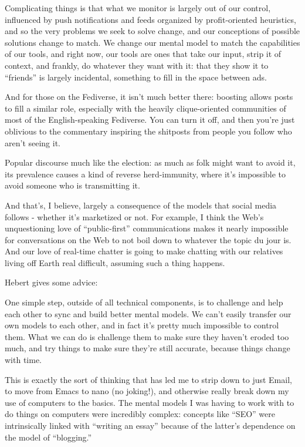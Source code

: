 \documentclass[11pt]{article}
\begin{document}
\begin{itemize}
Complicating things is that what we monitor is largely out of our control, influenced by push notifications and feeds organized by profit-oriented heuristics, and so the very problems we seek to solve change, and our conceptions of possible solutions change to match. We change our mental model to match the capabilities of our tools, and right now, our tools are ones that take our input, strip it of context, and frankly, do whatever they want with it: that they show it to “friends” is largely incidental, something to fill in the space between ads.

And for those on the Fediverse, it isn’t much better there: boosting allows posts to fill a similar role, especially with the heavily clique-oriented communities of most of the English-speaking Fediverse. You can turn it off, and then you’re just oblivious to the commentary inspiring the shitposts from people you follow who aren’t seeing it.

Popular discourse much like the election: as much as folk might want to avoid it, its prevalence causes a kind of reverse herd-immunity, where it’s impossible to avoid someone who is transmitting it.

And that’s, I believe, largely a consequence of the models that social media follows - whether it’s marketized or not. For example, I think the Web’s unquestioning love of “public-first” communications makes it nearly impossible for conversations on the Web to not boil down to whatever the topic du jour is. And our love of real-time chatter is going to make chatting with our relatives living off Earth real difficult, assuming such a thing happens.

Hebert gives some advice:

One simple step, outside of all technical components, is to challenge and help each other to sync and build better mental models. We can't easily transfer our own models to each other, and in fact it's pretty much impossible to control them. What we can do is challenge them to make sure they haven't eroded too much, and try things to make sure they're still accurate, because things change with time.

This is exactly the sort of thinking that has led me to strip down to just Email, to move from Emacs to nano (no joking!), and otherwise really break down my use of computers to the basics. The mental models I was having to work with to do things on computers were incredibly complex: concepts like “SEO” were intrinsically linked with “writing an essay” because of the latter’s dependence on the model of “blogging.”


\end{itemize}
\end{document}
